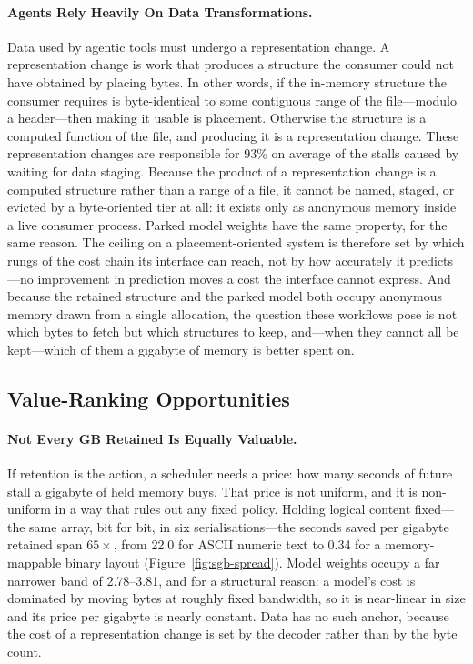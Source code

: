 \paragraph{Agents Rely Heavily On Data Transformations.}
Data used by agentic tools must undergo a representation change. A
representation change is work that produces a structure the consumer could not
have obtained by placing bytes. In other words, if the in-memory structure the
consumer requires is byte-identical to some contiguous range of the
file---modulo a header---then making it usable is placement. Otherwise the
structure is a computed function of the file, and producing it is a
representation change. These representation changes are responsible for 93\%
on average of the stalls caused by waiting for data staging. Because the
product of a representation change is a computed structure rather than a range
of a file, it cannot be named, staged, or evicted by a byte-oriented tier at
all: it exists only as anonymous memory inside a live consumer process. Parked
model weights have the same property, for the same reason. The ceiling on a
placement-oriented system is therefore set by which rungs of the cost chain
its interface can reach, not by how accurately it predicts---no improvement in
prediction moves a cost the interface cannot express. And because the retained
structure and the parked model both occupy anonymous memory drawn from a
single allocation, the question these workflows pose is not which bytes to
fetch but which structures to keep, and---when they cannot all be kept---which
of them a gigabyte of memory is better spent on.

\subsection{Value-Ranking Opportunities}

\paragraph{Not Every GB Retained Is Equally Valuable.}
If retention is the action, a scheduler needs a price: how many seconds of
future stall a gigabyte of held memory buys. That price is not uniform, and it
is non-uniform in a way that rules out any fixed policy. Holding logical
content fixed---the same array, bit for bit, in six serialisations---the
seconds saved per gigabyte retained span $65\times$, from 22.0 for ASCII
numeric text to 0.34 for a memory-mappable binary layout
(Figure~\ref{fig:sgb-spread}). Model weights occupy a far narrower band of
2.78--3.81, and for a structural reason: a model's cost is dominated by moving
bytes at roughly fixed bandwidth, so it is near-linear in size and its price
per gigabyte is nearly constant. Data has no such anchor, because the cost of
a representation change is set by the decoder rather than by the byte count.

